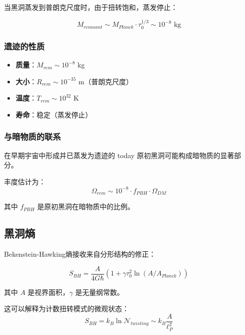 当黑洞蒸发到普朗克尺度时，由于扭转饱和，蒸发停止：

\begin{equation}
    M_{remnant} \sim M_{Planck} \cdot \tau_0^{1/3} \sim 10^{-8} \text{ kg}
\end{equation}

\subsubsection{遗迹的性质}

\begin{itemize}
    \item \textbf{质量}：$M_{rem} \sim 10^{-8}$ kg
    \item \textbf{大小}：$R_{rem} \sim 10^{-35}$ m（普朗克尺度）
    \item \textbf{温度}：$T_{rem} \sim 10^{32}$ K
    \item \textbf{寿命}：稳定（蒸发停止）
\end{itemize}

\subsubsection{与暗物质的联系}

\begin{proposition}[作为暗物质的遗迹]
在早期宇宙中形成并已蒸发为遗迹的 today 原初黑洞可能构成暗物质的显著部分。
\end{proposition}

丰度估计为：
\begin{equation}
    \Omega_{rem} \sim 10^{-8} \cdot f_{PBH} \cdot \Omega_{DM}
\end{equation}

其中 $f_{PBH}$ 是原初黑洞在暗物质中的比例。

\subsection{黑洞熵}

Bekenstein-Hawking熵接收来自分形结构的修正：

\begin{equation}
    S_{BH} = \frac{A}{4G\hbar}(1 + \gamma \tau_0^2 \ln(A/A_{Planck}))
\end{equation}

其中 $A$ 是视界面积，$\gamma$ 是无量纲常数。

这可以解释为计数扭转模式的微观状态：
\begin{equation}
    S_{BH} = k_B \ln \mathcal{N}_{twisting} \sim k_B \frac{A}{\ell_P^2}
\end{equation}

